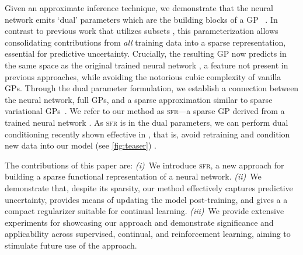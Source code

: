 \documentclass{article}
\newcommand{\our}{\textsc{sfr}\xspace}
\begin{document}
Given an approximate inference technique, we demonstrate that the neural network emits `dual' parameters which are the building blocks of a GP~\cite{csato2002sparse, adam2021dual, chang2020fast} . In contrast to previous work that utilizes subsets  \cite{immer2021scalable}, this parameterization allows consolidating contributions from {\em all} training data into a sparse representation, essential for predictive uncertainty. Crucially, the resulting GP now predicts in the same space as the original trained neural network , a feature not present in previous approaches, while avoiding the notorious cubic complexity of vanilla GPs. Through the dual parameter formulation, we establish a connection between the neural network, full GPs, and a sparse approximation similar to sparse variational GPs~\cite{titsias2009variational}. We refer to our method as \our---a sparse GP derived from a trained neural network . As \our is in the dual parameters, we can perform dual conditioning recently shown effective in \cite{chang2022fantasizing}, that is, avoid retraining and condition new data into our model (see \cref{fig:teaser}) .


The contributions of this paper are:
%
{\em (i)}~We introduce \our, a new approach for building a sparse functional representation of a neural network.
{\em (ii)}~We demonstrate that, despite its sparsity, our method effectively captures predictive uncertainty, provides means of updating the model post-training, and gives a a compact regularizer suitable for continual learning.
{\em (iii)}~We provide extensive experiments for showcasing our approach and demonstrate significance and applicability across supervised, continual, and reinforcement learning, aiming to stimulate future use of the approach.
\end{document}
